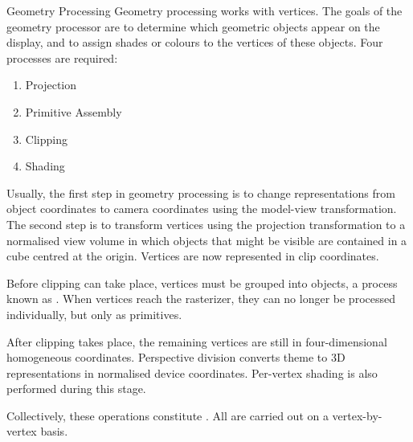\documentclass[../COS3712_Notes.tex]{subfiles}
\begin{document}
      \begin{definition}{Geometry Processing}
        Geometry processing works with vertices.
        The goals of the geometry processor are to determine which geometric objects
        appear on the display, and to assign shades or colours to the vertices of these objects.
        Four processes are required:
        \begin{enumerate}[nosep]
          \item Projection
          \item Primitive Assembly
          \item Clipping
          \item Shading
        \end{enumerate}

        Usually, the first step in geometry processing is to change representations
        from object coordinates to camera coordinates using the model-view transformation.
        The second step is to transform vertices using the projection transformation
        to a normalised view volume in which objects that might be visible are contained
        in a cube centred at the origin.
        Vertices are now represented in clip coordinates.

        Before clipping can take place, vertices must be grouped into objects,
        a process known as .
        When vertices reach the rasterizer, they can no longer
        be processed individually, but only as primitives.

        After clipping takes place, the remaining vertices are still in four-dimensional
        homogeneous coordinates.
        Perspective division converts theme to 3D representations in normalised device coordinates.
        Per-vertex shading is also performed during this stage.

        Collectively, these operations constitute .
        All are carried out on a vertex-by-vertex basis.
      \end{definition}
\end{document}
